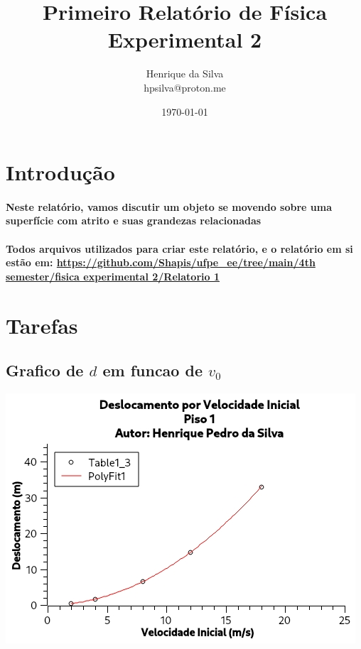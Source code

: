 \documentclass[12pt,twoside, a4paper, twocolumn]{article}
\title{Primeiro Relatório de Física Experimental 2}
\author{Henrique da Silva \\ hpsilva@proton.me}
\date{\today}
\begin{document}
\maketitle
{}
\newpage
\tableofcontents
\newpage

\section{Introdução}

\paragraph*{Neste relatório, vamos discutir um objeto se movendo sobre uma superfície com atrito e suas grandezas relacionadas}

\paragraph*{Todos arquivos utilizados para criar este relatório, e o relatório em si estão em:  \url{https://github.com/Shapis/ufpe_ee/tree/main/4th semester/fisica experimental 2/Relatorio 1}}

\section{Tarefas}

\subsection{Grafico de $d$ em funcao de $v_0$}



\begin{adjustbox}{scale=0.75}
    \includegraphics{Grafico-0.jpg}
\end{adjustbox}
\end{document}
